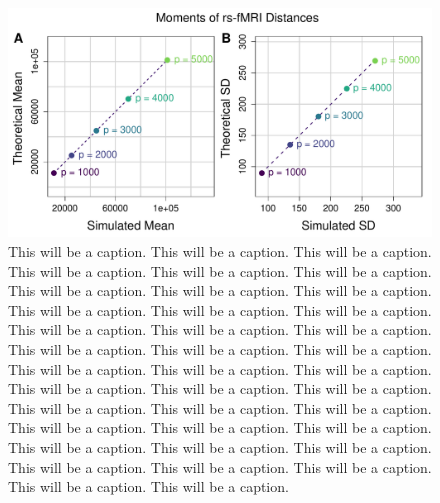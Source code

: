 \documentclass[10pt,letterpaper]{article}\usepackage[]{graphicx}\usepackage[]{color}
\begin{document}
\begin{figure}[H]
	\includegraphics[width=\textwidth]{compared_moments_rs-fMRI_standard.pdf}
	\caption{This will be a caption. This will be a caption. This will be a caption. This will be a caption. This will be a caption. This will be a caption. This will be a caption. This will be a caption. This will be a caption. This will be a caption. This will be a caption. This will be a caption. This will be a caption. This will be a caption. This will be a caption. This will be a caption. This will be a caption. This will be a caption. This will be a caption. This will be a caption. This will be a caption. This will be a caption. This will be a caption. This will be a caption. This will be a caption. This will be a caption. This will be a caption. This will be a caption. This will be a caption. This will be a caption. This will be a caption. This will be a caption. This will be a caption. This will be a caption. This will be a caption. This will be a caption. This will be a caption. This will be a caption.}
\end{figure}
\end{document}
